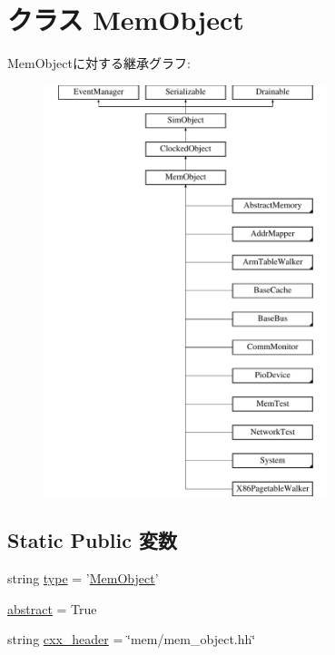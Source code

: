 \hypertarget{classMemObject_1_1MemObject}{
\section{クラス MemObject}
\label{classMemObject_1_1MemObject}
}
MemObjectに対する継承グラフ:\begin{figure}[H]
\begin{center}
\leavevmode
\includegraphics[height=12cm]{classMemObject_1_1MemObject}
\end{center}
\end{figure}
\subsection*{Static Public 変数}
\begin{DoxyCompactItemize}
\item 
string \hyperlink{classMemObject_1_1MemObject_acce15679d830831b0bbe8ebc2a60b2ca}{type} = '\hyperlink{classMemObject_1_1MemObject}{MemObject}'
\item 
\hyperlink{classMemObject_1_1MemObject_a17fa61ac3806b481cafee5593b55e5d0}{abstract} = True
\item 
string \hyperlink{classMemObject_1_1MemObject_a17da7064bc5c518791f0c891eff05fda}{cxx\_\-header} = \char`\"{}mem/mem\_\-object.hh\char`\"{}
\end{DoxyCompactItemize}


